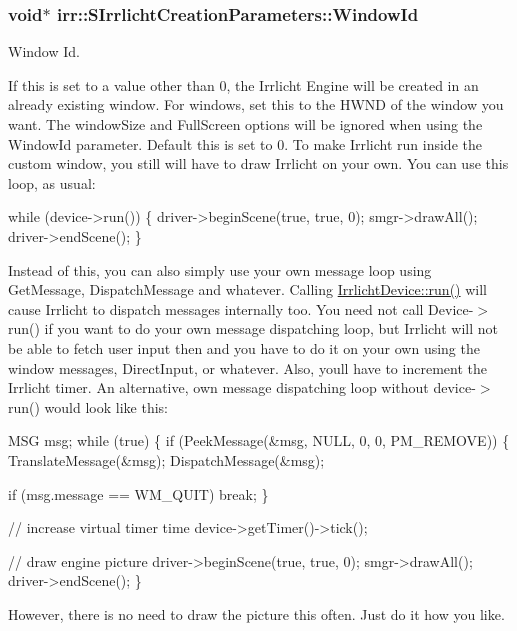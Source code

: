 \subsubsection[{\texorpdfstring{Window\+Id}{WindowId}}]{\setlength{\rightskip}{0pt plus 5cm}void$\ast$ irr\+::\+S\+Irrlicht\+Creation\+Parameters\+::\+Window\+Id}\hypertarget{structirr_1_1SIrrlichtCreationParameters_af287810d910a23f8f7db98cef87b6eae}{}\label{structirr_1_1SIrrlichtCreationParameters_af287810d910a23f8f7db98cef87b6eae}


Window Id. 

If this is set to a value other than 0, the Irrlicht Engine will be created in an already existing window. For windows, set this to the H\+W\+ND of the window you want. The window\+Size and Full\+Screen options will be ignored when using the Window\+Id parameter. Default this is set to 0. To make Irrlicht run inside the custom window, you still will have to draw Irrlicht on your own. You can use this loop, as usual\+: 
\begin{DoxyCode}
\textcolor{keywordflow}{while} (device->run())
\{
    driver->beginScene(\textcolor{keyword}{true}, \textcolor{keyword}{true}, 0);
    smgr->drawAll();
    driver->endScene();
\}
\end{DoxyCode}
 Instead of this, you can also simply use your own message loop using Get\+Message, Dispatch\+Message and whatever. Calling \hyperlink{classirr_1_1IrrlichtDevice_a0489f8151dc43f6f41503ffb5a160b35}{Irrlicht\+Device\+::run()} will cause Irrlicht to dispatch messages internally too. You need not call Device-\/$>$run() if you want to do your own message dispatching loop, but Irrlicht will not be able to fetch user input then and you have to do it on your own using the window messages, Direct\+Input, or whatever. Also, you\textquotesingle{}ll have to increment the Irrlicht timer. An alternative, own message dispatching loop without device-\/$>$run() would look like this\+: 
\begin{DoxyCode}
MSG msg;
\textcolor{keywordflow}{while} (\textcolor{keyword}{true})
\{
    \textcolor{keywordflow}{if} (PeekMessage(&msg, NULL, 0, 0, PM\_REMOVE))
    \{
        TranslateMessage(&msg);
        DispatchMessage(&msg);

        \textcolor{keywordflow}{if} (msg.message == WM\_QUIT)
            \textcolor{keywordflow}{break};
    \}

    \textcolor{comment}{// increase virtual timer time}
    device->getTimer()->tick();

    \textcolor{comment}{// draw engine picture}
    driver->beginScene(\textcolor{keyword}{true}, \textcolor{keyword}{true}, 0);
    smgr->drawAll();
    driver->endScene();
\}
\end{DoxyCode}
 However, there is no need to draw the picture this often. Just do it how you like. 
